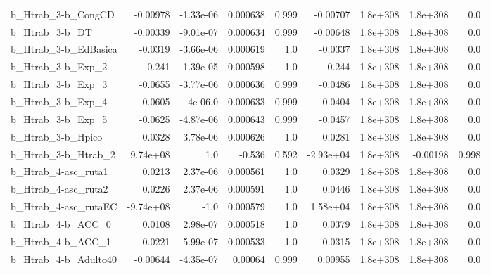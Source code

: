 \begin{tabular}{lrrrrrrrr}
b\_Htrab\_3-b\_CongCD           &    -0.00978 &    -1.33e-06 &  0.000638 &    0.999 &   -0.00707 &    1.8e+308 &     1.8e+308 &           0.0 \\
b\_Htrab\_3-b\_DT               &    -0.00339 &    -9.01e-07 &  0.000634 &    0.999 &   -0.00648 &    1.8e+308 &     1.8e+308 &           0.0 \\
b\_Htrab\_3-b\_EdBasica         &     -0.0319 &    -3.66e-06 &  0.000619 &      1.0 &    -0.0337 &    1.8e+308 &     1.8e+308 &           0.0 \\
b\_Htrab\_3-b\_Exp\_2            &      -0.241 &    -1.39e-05 &  0.000598 &      1.0 &     -0.244 &    1.8e+308 &     1.8e+308 &           0.0 \\
b\_Htrab\_3-b\_Exp\_3            &     -0.0655 &    -3.77e-06 &  0.000636 &    0.999 &    -0.0486 &    1.8e+308 &     1.8e+308 &           0.0 \\
b\_Htrab\_3-b\_Exp\_4            &     -0.0605 &     -4e-06.0 &  0.000633 &    0.999 &    -0.0404 &    1.8e+308 &     1.8e+308 &           0.0 \\
b\_Htrab\_3-b\_Exp\_5            &     -0.0625 &    -4.87e-06 &  0.000643 &    0.999 &    -0.0457 &    1.8e+308 &     1.8e+308 &           0.0 \\
b\_Htrab\_3-b\_Hpico            &      0.0328 &     3.78e-06 &  0.000626 &      1.0 &     0.0281 &    1.8e+308 &     1.8e+308 &           0.0 \\
b\_Htrab\_3-b\_Htrab\_2          &    9.74e+08 &          1.0 &    -0.536 &    0.592 &  -2.93e+04 &    1.8e+308 &     -0.00198 &         0.998 \\
b\_Htrab\_4-asc\_ruta1          &      0.0213 &     2.37e-06 &  0.000561 &      1.0 &     0.0329 &    1.8e+308 &     1.8e+308 &           0.0 \\
b\_Htrab\_4-asc\_ruta2          &      0.0226 &     2.37e-06 &  0.000591 &      1.0 &     0.0446 &    1.8e+308 &     1.8e+308 &           0.0 \\
b\_Htrab\_4-asc\_rutaEC         &   -9.74e+08 &         -1.0 &  0.000579 &      1.0 &   1.58e+04 &    1.8e+308 &     1.8e+308 &           0.0 \\
b\_Htrab\_4-b\_ACC\_0            &      0.0108 &     2.98e-07 &  0.000518 &      1.0 &     0.0379 &    1.8e+308 &     1.8e+308 &           0.0 \\
b\_Htrab\_4-b\_ACC\_1            &      0.0221 &     5.99e-07 &  0.000533 &      1.0 &     0.0315 &    1.8e+308 &     1.8e+308 &           0.0 \\
b\_Htrab\_4-b\_Adulto40         &    -0.00644 &    -4.35e-07 &   0.00064 &    0.999 &    0.00955 &    1.8e+308 &     1.8e+308 &           0.0 \\

\end{tabular}
